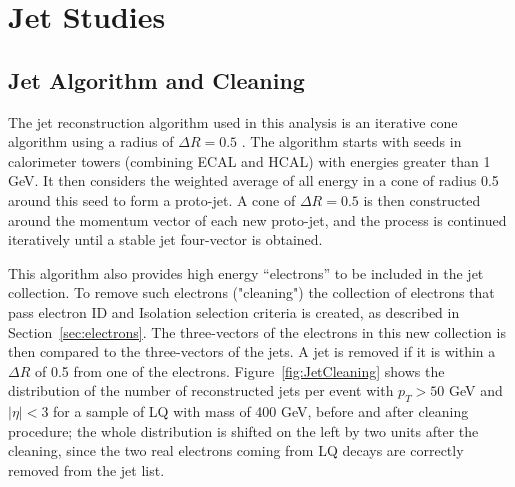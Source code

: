 %
\section{Jet Studies} \label{sec:jet}

\subsection{Jet Algorithm and Cleaning}

The jet reconstruction algorithm used in this analysis is an iterative cone algorithm using a radius of $\Delta R=0.5$ \cite{JetAlg}.  
The algorithm starts with seeds in calorimeter towers (combining ECAL and HCAL) with energies greater than 
1 GeV. It then considers the weighted average of all energy in a cone of radius 0.5 around this seed to form a proto-jet.  
A cone of $\Delta R = 0.5$ is then constructed around the momentum vector of each new proto-jet,  
and the process is continued iteratively until a stable jet four-vector is obtained.


This algorithm also provides high energy ``electrons'' to be included in the jet collection. 
To remove such electrons ("cleaning") the collection of electrons that pass electron ID and Isolation 
selection criteria is created, as described in Section~\ref{sec:electrons}. The three-vectors of the 
electrons in this new collection is then compared to the three-vectors of the jets. 
A jet is removed if it is within a $\Delta R$ of 0.5 from one of the electrons. 
Figure~\ref{fig:JetCleaning} shows the distribution of the number of reconstructed jets 
per event with $p_{T}>50$ GeV and $|\eta|<3$ for a sample of LQ with mass of 400 GeV, before and after cleaning procedure; 
the whole distribution is shifted on the left by two units after the cleaning, since the two real electrons 
coming from LQ decays are correctly removed from the jet list. 

